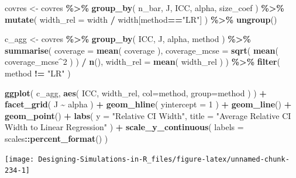 \documentclass[
]{book}
\newenvironment{Shaded}{\begin{snugshade}}{\end{snugshade}}
\newcommand{\AttributeTok}[1]{\textcolor[rgb]{0.13,0.29,0.53}{#1}}
\newcommand{\DecValTok}[1]{\textcolor[rgb]{0.00,0.00,0.81}{#1}}
\newcommand{\FunctionTok}[1]{\textcolor[rgb]{0.13,0.29,0.53}{\textbf{#1}}}
\newcommand{\NormalTok}[1]{#1}
\newcommand{\OtherTok}[1]{\textcolor[rgb]{0.56,0.35,0.01}{#1}}
\newcommand{\SpecialCharTok}[1]{\textcolor[rgb]{0.81,0.36,0.00}{\textbf{#1}}}
\newcommand{\StringTok}[1]{\textcolor[rgb]{0.31,0.60,0.02}{#1}}
\begin{document}
\begin{Shaded}
\begin{Highlighting}[]
\NormalTok{covres }\OtherTok{\textless{}{-}}\NormalTok{ covres }\SpecialCharTok{\%\textgreater{}\%}
  \FunctionTok{group\_by}\NormalTok{( n\_bar, J, ICC, alpha, size\_coef ) }\SpecialCharTok{\%\textgreater{}\%}
  \FunctionTok{mutate}\NormalTok{( }\AttributeTok{width\_rel =}\NormalTok{ width }\SpecialCharTok{/}\NormalTok{ width[method}\SpecialCharTok{==}\StringTok{"LR"}\NormalTok{] ) }\SpecialCharTok{\%\textgreater{}\%}
  \FunctionTok{ungroup}\NormalTok{()}

\NormalTok{c\_agg }\OtherTok{\textless{}{-}}\NormalTok{ covres }\SpecialCharTok{\%\textgreater{}\%}
  \FunctionTok{group\_by}\NormalTok{( ICC, J, alpha, method ) }\SpecialCharTok{\%\textgreater{}\%}
  \FunctionTok{summarise}\NormalTok{( }\AttributeTok{coverage =} \FunctionTok{mean}\NormalTok{( coverage ),}
             \AttributeTok{coverage\_mcse =} \FunctionTok{sqrt}\NormalTok{( }\FunctionTok{mean}\NormalTok{( coverage\_mcse}\SpecialCharTok{\^{}}\DecValTok{2}\NormalTok{ ) ) }\SpecialCharTok{/} \FunctionTok{n}\NormalTok{(),}
             \AttributeTok{width\_rel =} \FunctionTok{mean}\NormalTok{( width\_rel ) ) }\SpecialCharTok{\%\textgreater{}\%}
  \FunctionTok{filter}\NormalTok{( method }\SpecialCharTok{!=} \StringTok{"LR"}\NormalTok{ )}
  
\FunctionTok{ggplot}\NormalTok{( c\_agg, }\FunctionTok{aes}\NormalTok{( ICC, width\_rel, }\AttributeTok{col=}\NormalTok{method, }\AttributeTok{group=}\NormalTok{method ) ) }\SpecialCharTok{+}
  \FunctionTok{facet\_grid}\NormalTok{( J }\SpecialCharTok{\textasciitilde{}}\NormalTok{ alpha ) }\SpecialCharTok{+}
  \FunctionTok{geom\_hline}\NormalTok{( }\AttributeTok{yintercept =} \DecValTok{1}\NormalTok{ ) }\SpecialCharTok{+}
  \FunctionTok{geom\_line}\NormalTok{() }\SpecialCharTok{+} \FunctionTok{geom\_point}\NormalTok{() }\SpecialCharTok{+}
  \FunctionTok{labs}\NormalTok{( }\AttributeTok{y =} \StringTok{"Relative CI Width"}\NormalTok{,}
        \AttributeTok{title =} \StringTok{"Average Relative CI Width to Linear Regression"}\NormalTok{ ) }\SpecialCharTok{+}
  \FunctionTok{scale\_y\_continuous}\NormalTok{( }\AttributeTok{labels =}\NormalTok{ scales}\SpecialCharTok{::}\FunctionTok{percent\_format}\NormalTok{() )}
\end{Highlighting}
\end{Shaded}

\begin{center}\texttt{[image: Designing-Simulations-in-R\_files/figure-latex/unnamed-chunk-234-1]} \end{center}
\end{document}
